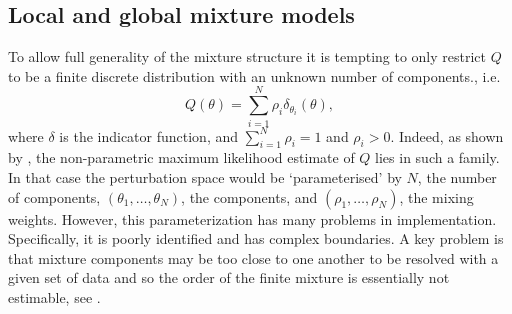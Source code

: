 \documentclass[graybox]{svmult}
\begin{document}
\subsection{Local and global mixture models}\label{Local Mixture Method}


To allow full generality of the mixture structure it  is tempting to only restrict $Q$ to be a finite discrete distribution with an unknown number of components., i.e. 
$$
Q(\theta) = \sum_{i=1}^N \rho_i \delta_{\theta_i}(\theta),
$$ where $\delta$ is the indicator function, and $\sum_{i=1}^N \rho_i =1$ and $ \rho_i > 0$.
Indeed, as shown
by \cite{Lindsay1995}, the non-parametric maximum likelihood estimate of $Q$ lies in such a family. In that case the perturbation space would be `parameterised' by $N$, the number of components, $(\theta_1, \dots, \theta_N)$, the components, and  $(\rho_1, \dots, \rho_N)$, the mixing weights. However, this parameterization  has many problems in implementation. Specifically,  it is poorly identified and has complex boundaries.  A key problem is that mixture components may be too  close to one another to be  resolved with a given set of data and so the order of the finite mixture is essentially not estimable, see \cite{Maroufy2016a}. 
\end{document}
